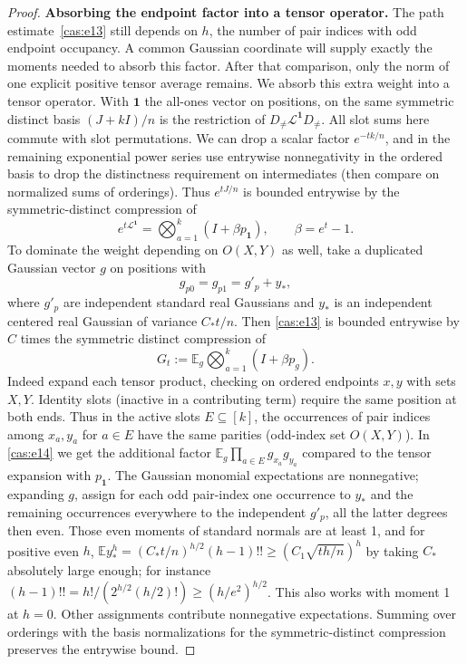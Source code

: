 \begin{proof}
\medskip\noindent\textbf{Absorbing the endpoint factor into a tensor operator.}\enspace
The path estimate~\eqref{cas:e13} still depends on $h$, the number of pair
indices with odd endpoint occupancy.  A common Gaussian coordinate will
supply exactly the moments needed to absorb this factor.  After that
comparison, only the norm of one explicit positive tensor average remains.
We absorb this extra weight into a tensor operator. With \(\mathbf 1\) the all-ones vector on positions, on the same symmetric distinct basis \((J+kI)/n\) is the restriction of \(D_{\ne}\mathcal L^{\mathbf 1} D_{\ne}\). All slot sums here commute with slot permutations. We can drop a scalar factor \(e^{-tk/n}\), and in the remaining exponential power series use entrywise nonnegativity in the ordered basis to drop the distinctness requirement on intermediates (then compare on normalized sums of orderings). Thus \(e^{tJ/n}\) is bounded entrywise by the symmetric-distinct compression of
\[
e^{t\mathcal L^{\mathbf 1}}=\bigotimes_{a=1}^k (I+\beta p_{\mathbf 1}),\qquad \beta=e^t-1.
\]
To dominate the weight depending on \(O(X,Y)\) as well, take a duplicated Gaussian vector \(g\) on positions with
\[
g_{p0}=g_{p1}=g'_p+y_*, 
\]
where \(g'_p\) are independent standard real Gaussians and \(y_*\) is an independent centered real Gaussian of variance \(C_* t/n\). Then \eqref{cas:e13} is bounded entrywise by \(C\) times the symmetric distinct compression of
\begin{equation}
G_t:=\mathbb E_g \bigotimes_{a=1}^k (I+\beta p_g).
\label{cas:e14}
\end{equation}
Indeed expand each tensor product, checking on ordered endpoints \(x,y\) with sets \(X,Y\). Identity slots (inactive in a contributing term) require the same position at both ends. Thus in the active slots \(E\subseteq [k]\), the occurrences of pair indices among \(x_a,y_a\) for \(a\in E\) have the same parities (odd-index set \(O(X,Y)\)). In \eqref{cas:e14} we get the additional factor \(\mathbb E_g\prod_{a\in E}g_{x_a}g_{y_a}\) compared to the tensor expansion with \(p_{\mathbf 1}\). The Gaussian monomial expectations are nonnegative; expanding \(g\), assign for each odd pair-index one occurrence to \(y_*\) and the remaining occurrences everywhere to the independent \(g'_p\), all the latter degrees then even. Those even moments of standard normals are at least 1, and for positive even \(h\),
\(\mathbb E y_*^h=(C_*t/n)^{h/2}(h-1)!!\ge (C_1\sqrt{th/n})^h\)
by taking \(C_*\) absolutely large enough; for instance \((h-1)!!=h!/(2^{h/2}(h/2)!)\ge (h/e^2)^{h/2}\). This also works with moment 1 at \(h=0\). Other assignments contribute nonnegative expectations. Summing over orderings with the basis normalizations for the symmetric-distinct compression preserves the entrywise bound.


\end{proof}
